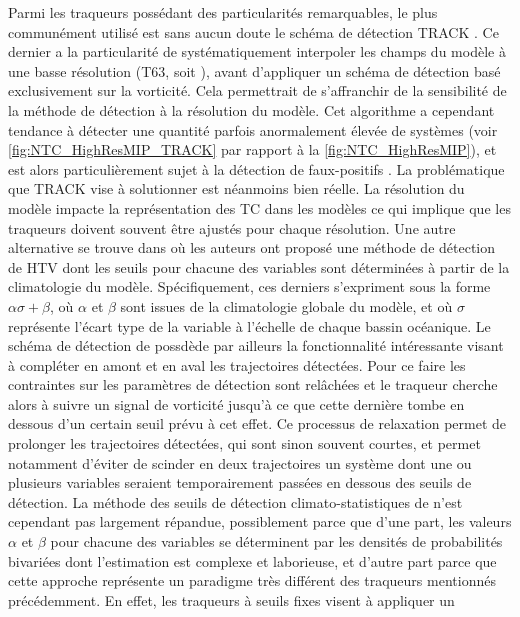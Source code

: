 \documentclass[../main.tex]{subfiles}
\begin{document}
Parmi les traqueurs possédant des particularités remarquables, le plus communément utilisé est sans aucun doute le schéma de détection TRACK
\parencite{hodges_how_2017}. Ce dernier a la particularité de systématiquement interpoler les champs du modèle à une basse résolution (T63, soit ),
avant d'appliquer un schéma de détection basé exclusivement sur la vorticité. Cela permettrait de s'affranchir de la sensibilité de la méthode de détection à la
résolution du modèle. Cet algorithme a cependant tendance à détecter une quantité parfois anormalement élevée de systèmes (voir \cref{fig:NTC_HighResMIP_TRACK}
par rapport à la \cref{fig:NTC_HighResMIP}), et est alors particulièrement sujet à la détection de faux-positifs \parencite{bourdin_intercomparison_2022}. La
problématique que TRACK vise à solutionner est néanmoins bien réelle. La résolution du modèle impacte la représentation des TC dans les modèles ce qui implique
que les traqueurs doivent souvent être ajustés pour chaque résolution. Une autre alternative se trouve dans \textcite{camargo_improving_2002} où les auteurs ont
proposé une méthode de détection de HTV dont les seuils pour chacune des variables sont déterminées à partir de la climatologie du modèle. Spécifiquement, ces
derniers s'expriment sous la forme $\alpha \sigma + \beta$, où $\alpha$ et $\beta$ sont issues de la climatologie globale du modèle, et où $\sigma$ représente
l'écart type de la variable à l'échelle de chaque bassin océanique. Le schéma de détection de \textcite{camargo_improving_2002} possdède par ailleurs la
fonctionnalité intéressante visant à compléter en amont et en aval les trajectoires détectées. Pour ce faire les contraintes sur les paramètres de détection
sont relâchées et le traqueur cherche alors à suivre un signal de vorticité jusqu'à ce que cette dernière tombe en dessous d'un certain seuil prévu à cet effet.
Ce processus de relaxation permet de prolonger les trajectoires détectées, qui sont sinon souvent courtes, et permet notamment d'éviter de scinder en deux
trajectoires un système dont une ou plusieurs variables seraient temporairement passées en dessous des seuils de détection. La méthode des seuils de détection
climato-statistiques de \textcite{camargo_improving_2002} n'est cependant pas largement répandue, possiblement parce que d'une part, les valeurs $\alpha$ et
$\beta$ pour chacune des variables se déterminent par les densités de probabilités bivariées dont l'estimation est complexe et laborieuse, et d'autre part parce
que cette approche représente un paradigme très différent des traqueurs mentionnés précédemment. En effet, les traqueurs à seuils fixes visent à appliquer un
\end{document}
